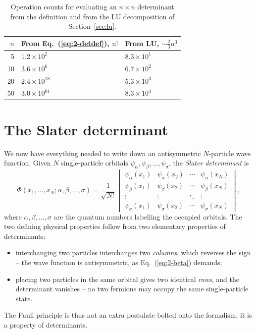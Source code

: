 \begin{table}[h]
\centering
\renewcommand{\arraystretch}{1.25}
\setlength{\tabcolsep}{12pt}
\begin{tabular}{rll}
\toprule
$n$ & \textbf{From Eq.~(\ref{eq:2-detdef}), $n!$} &
\textbf{From LU, $\sim\tfrac{2}{3}n^3$}\\
\midrule
 5 & $1.2\times10^{2}$  & $8.3\times10^{1}$\\
10 & $3.6\times10^{6}$  & $6.7\times10^{2}$\\
20 & $2.4\times10^{18}$ & $5.3\times10^{3}$\\
50 & $3.0\times10^{64}$ & $8.3\times10^{4}$\\
\bottomrule
\end{tabular}
\caption{Operation counts for evaluating an $n\times n$ determinant from the
definition and from the LU decomposition of Section~\ref{sec:lu}.}
\label{tab:detcost}
\end{table}

\section{The Slater determinant}
\label{sec:slaterdet}

We now have everything needed to write down an antisymmetric $N$-particle
wave function.  Given $N$ single-particle orbitals
$\psi_{\alpha},\psi_{\beta},\dots,\psi_{\sigma}$, the \emph{Slater
determinant} is
\begin{equation}
  \Phi(x_1,\dots,x_N;\alpha,\beta,\dots,\sigma)
  =\frac{1}{\sqrt{N!}}
  \begin{vmatrix}
    \psi_\alpha(x_1) & \psi_\alpha(x_2) & \cdots & \psi_\alpha(x_N)\\
    \psi_\beta(x_1)  & \psi_\beta(x_2)  & \cdots & \psi_\beta(x_N)\\
    \vdots & \vdots & \ddots & \vdots\\
    \psi_\sigma(x_1) & \psi_\sigma(x_2) & \cdots & \psi_\sigma(x_N)
  \end{vmatrix},
  \label{eq:SlatDet}
\end{equation}
where $\alpha,\beta,\dots,\sigma$ are the quantum numbers labelling the
occupied orbitals.  The two defining physical properties follow from two
elementary properties of determinants:
\begin{itemize}
  \item interchanging two particles interchanges two \emph{columns}, which
        reverses the sign -- the wave function is antisymmetric, as
        Eq.~(\ref{eq:2-beta}) demands;
  \item placing two particles in the same orbital gives two identical
        \emph{rows}, and the determinant vanishes -- no two fermions may
        occupy the same single-particle state.
\end{itemize}
The Pauli principle is thus not an extra postulate bolted onto the formalism;
it is a property of determinants.

